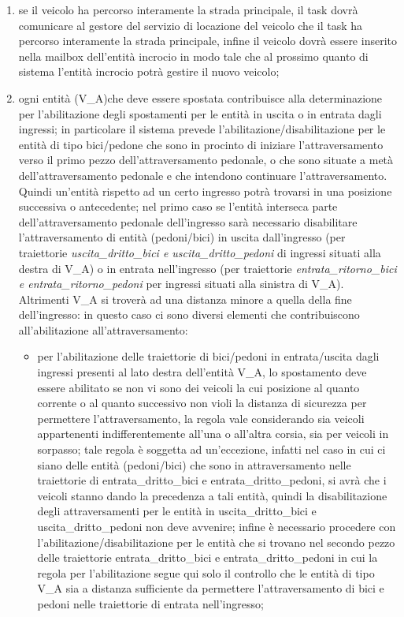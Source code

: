 \begin{enumerate}
\begin{enumerate}
\item se il veicolo ha percorso interamente la strada principale, il task dovrà comunicare al gestore del servizio di locazione del veicolo che il task ha percorso interamente la strada principale, infine il veicolo dovrà essere inserito nella mailbox dell'entità incrocio in modo tale che al prossimo quanto di sistema l'entità incrocio potrà gestire il nuovo veicolo;
\item ogni entità (V\_A)che deve essere spostata contribuisce alla determinazione per l'abilitazione degli spostamenti per le entità in uscita o in entrata dagli ingressi; in particolare il sistema prevede l'abilitazione/disabilitazione per le entità di tipo bici/pedone che sono in procinto di iniziare l'attraversamento verso il primo pezzo dell'attraversamento pedonale, o che sono situate a metà dell'attraversamento pedonale e che intendono continuare l'attraversamento. Quindi un'entità rispetto ad un certo ingresso potrà trovarsi in una posizione successiva o antecedente; nel primo caso se l'entità interseca parte dell'attraversamento pedonale dell'ingresso sarà necessario disabilitare l'attraversamento di entità (pedoni/bici) in uscita dall'ingresso (per traiettorie \textit{usci\-ta\_drit\-to\_bi\-ci e usci\-ta\_drit\-to\_pe\-do\-ni} di ingressi situati alla destra di V\_A) o in entrata nell'ingresso (per traiettorie \textit{en\-tra\-ta\_ri\-tor\-no\_bi\-ci e en\-tra\-ta\_ri\-tor\-no\_pe\-do\-ni} per ingressi situati alla sinistra di V\_A). Altrimenti V\_A si troverà ad una distanza minore a quella della fine dell'ingresso: in questo caso ci sono diversi elementi che contribuiscono all'abilitazione all'attraversamento:
\begin{itemize}
\item per l'abilitazione delle traiettorie di bici/pedoni in entrata/uscita dagli ingressi presenti al lato destra dell'entità V\_A, lo spostamento deve essere abilitato se non vi sono dei veicoli la cui posizione al quanto corrente o al quanto successivo non violi la distanza di sicurezza per permettere l'attraversamento, la regola vale considerando sia veicoli appartenenti indifferentemente all'una o all'altra corsia, sia per veicoli in sorpasso; tale regola è soggetta ad un'eccezione, infatti nel caso in cui ci siano delle entità (pedoni/bici) che sono in attraversamento nelle traiettorie di en\-tra\-ta\_drit\-to\_bi\-ci e en\-tra\-ta\_drit\-to\_pe\-do\-ni, si avrà che i veicoli stanno dando la precedenza a tali entità, quindi la disabilitazione degli attraversamenti per le entità in usci\-ta\_drit\-to\_bi\-ci e usci\-ta\_drit\-to\_pe\-do\-ni non deve avvenire; infine è necessario procedere con l'abilitazione/disabilitazione per le entità che si trovano nel secondo pezzo delle traiettorie en\-tra\-ta\_drit\-to\_bi\-ci e en\-tra\-ta\_drit\-to\_pe\-do\-ni in cui la regola per l'abilitazione segue qui solo il controllo che le entità di tipo V\_A sia a distanza sufficiente da permettere l'attraversamento di bici e pedoni nelle traiettorie di entrata nell'ingresso;

\end{itemize}
\end{enumerate}
\end{enumerate}
